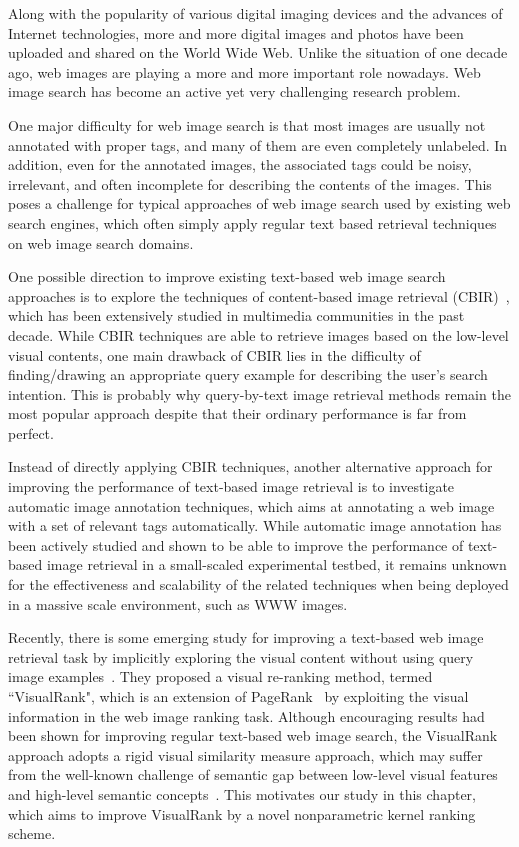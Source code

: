 Along with the popularity of various digital imaging devices and the advances of Internet technologies, more and more digital images and photos have been uploaded and shared on the World Wide Web. Unlike the situation of one decade ago, web images are playing a more and more important role nowadays. Web image search has become an active yet very challenging research problem.

One major difficulty for web image search is that most images are usually not
annotated with proper tags, and many of them are even completely unlabeled. In addition, even for the annotated images, the associated tags could be noisy, irrelevant, and often incomplete for describing the contents of the images. This poses a challenge for typical approaches of web image search used by existing web search engines, which often simply apply regular text based retrieval techniques on web image search domains.

One possible direction to improve existing text-based web image search approaches is to explore the techniques of content-based image retrieval (CBIR)~\cite{pami/SmeuldersWSGJ00,pami/SmeuldersWSGJ00}, which has been extensively studied in multimedia communities in the past decade. While CBIR techniques are able to retrieve images based on the low-level visual contents, one main drawback of CBIR lies in the difficulty of finding/drawing an appropriate query example for describing the user's search intention. This is probably why query-by-text image retrieval methods remain the most popular approach despite that their ordinary performance is far from perfect.

Instead of directly applying CBIR techniques, another alternative approach for
improving the performance of text-based image retrieval is to investigate automatic image annotation techniques, which aims at annotating a web image with a set of relevant tags automatically. While automatic image annotation has been actively studied and shown to be able to improve the performance of text-based image retrieval in a small-scaled experimental testbed, it remains unknown for the effectiveness and scalability of the related techniques when being deployed in a massive scale environment, such as WWW images.

Recently, there is some emerging study for improving a text-based web image
retrieval task by implicitly exploring the visual content without using query image examples~\cite{pami/JingB08}. They proposed a visual re-ranking method, termed ``VisualRank", which is an extension of PageRank~\cite{cn/BrinP98} by exploiting the visual information in the web image ranking task. Although encouraging results had been shown for improving regular text-based web image search, the VisualRank
approach adopts a rigid visual similarity measure approach, which may suffer from the well-known challenge of semantic gap between low-level visual features and high-level semantic concepts~\cite{pami/SmeuldersWSGJ00}. This motivates our study in this chapter, which aims to improve VisualRank by a novel nonparametric kernel ranking scheme.

